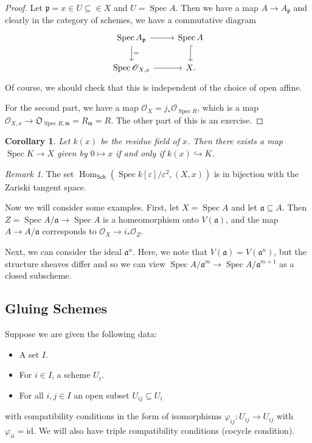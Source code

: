 \documentclass[leqno, openany]{memoir}
\newtheorem{cor}[thm]{Corollary}
\theoremstyle{definition}
\theoremstyle{remark}
\newtheorem{rmk}[thm]{Remark}
\theoremstyle{plain}
\theoremstyle{definition}
\theoremstyle{remark}
\newcommand{\ep}{\varepsilon}
\newcommand{\mf}[1]{\mathfrak{#1}}
\newcommand{\mr}[1]{\mathrm{#1}}
\newcommand{\ms}[1]{\mathsf{#1}}
\newcommand{\msc}[1]{\mathscr{#1}}
\DeclareMathOperator{\Hom}{Hom}
\DeclareMathOperator{\Spec}{Spec}
\begin{document}
\begin{proof}
    Let $\mf{p} = x \in U \subseteq \in X$ and $U = \Spec A$. Then we have a map $A \to A_{\mf{p}}$ and clearly in the category of schemes, we have a commutative diagram
    \begin{equation*}
    \begin{tikzcd}
        \Spec A_{\mf{p}} \arrow{r} \arrow{d}{=} & \Spec A \arrow[hookrightarrow]{d} \\
        \Spec \msc{O}_{X,x} \arrow{r} & X.
    \end{tikzcd}
    \end{equation*}
    Of course, we should check that this is independent of the choice of open affine.

    For the second part, we have a map $\msc{O}_{X} = j_* \msc{O}_{\Spec R}$, which is a map $\msc{O}_{X,x} \to \mf{O}_{\Spec R, \mf{m}} = R_{\mf{m}} = R$. The other part of this is an exercise.
\end{proof}

\begin{cor}
    Let $k(x)$ be the residue field of $x$. Then there exists a map $\Spec K \to X$ given by $0 \mapsto x$ if and only if $k(x) \hookrightarrow K$.
\end{cor}

\begin{rmk}
    The set $\Hom_{\ms{Sch}}(\Spec k[\ep]/\ep^2, (X, x))$ is in bijection with the Zariski tangent space.
\end{rmk}

Now we will consider some examples. First, let $X = \Spec A$ and let $\mf{a} \subseteq A$. Then $Z = \Spec A/\mf{a} \to \Spec A$ is a homeomorphism onto $V(\mf{a})$, and the map $A \to A/\mf{a}$ corresponds to $\msc{O}_X \to i_* \msc{O}_Z$.

Next, we can consider the ideal $\mf{a}^n$. Here, we note that $V(\mf{a}) = V(\mf{a}^n)$, but the structure sheaves differ and so we can view $\Spec A/\mf{a}^m \to \Spec A/\mf{a}^{m+1}$ as a closed subscheme.

\subsection{Gluing Schemes}%
\label{sub:gluing_schemes}

Suppose we are given the following data:
\begin{itemize}
    \item A set $I$.
    \item For $i \in I$, a scheme $U_i$.
    \item For all $i,j \in I$ an open subset $U_{ij} \subseteq U_i$
\end{itemize}
with compatibility conditions in the form of isomorphisms $\varphi_{ij} \colon U_{ij} \to U_{ij}$ with $\varphi_{ii} = \mr{id}$. We will also have triple compatibility conditions (cocycle condition).
\end{document}
